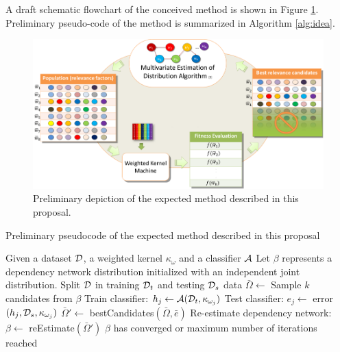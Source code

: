 A draft schematic flowchart of the conceived method is shown in Figure \ref{fig:im03}. Preliminary pseudo-code of the method is summarized in Algorithm \ref{alg:idea}.

\begin{figure}[ht]
	\centering
		\includegraphics{Images/flowchart.png}
	\caption{Preliminary depiction of the expected method described in this proposal.}
	\label{fig:im03}
\end{figure}

\begin{algorithm}[ht]
	\caption{\textsf{Preliminary pseudocode of the expected method described in this proposal}}
	\begin{algorithmic}
		\REQUIRE Given a dataset ${\cal D}$, a weighted kernel $\kappa_\omega$ and a classifier ${\cal A}$
		\STATE Let $\beta$ represents a dependency network distribution initialized with an independent joint distribution.
		\REPEAT 
			\STATE Split ${\cal D}$ in training ${\cal D}_{t}$ and testing ${\cal D}_{s}$ data
			\STATE $\bar{\Omega} \gets$ Sample $k$ candidates from $\beta$  
				\STATE Train classifier: $h_j \gets {\cal A} ({\cal D}_{t}, \kappa_{\omega_j})$
				\STATE Test classifier: $e_j \gets$ error$(h_j, {\cal D}_{s}, \kappa_{\omega_j})$
			\ENDFOR
			\STATE $\bar{\Omega}' \gets$ bestCandidates$(\bar{\Omega},\bar{e})$
			\STATE Re-estimate dependency network: $\beta \gets$ reEstimate$(\bar{\Omega}')$
	\UNTIL $\beta$ has converged or maximum number of iterations reached
	\end{algorithmic}
	\label{alg:idea}
\end{algorithm}